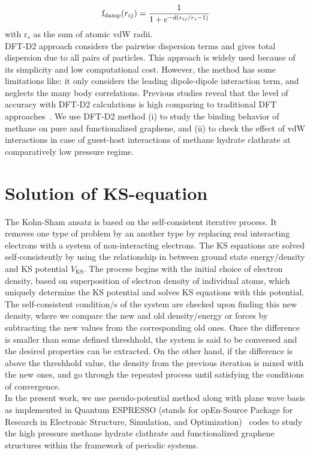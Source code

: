 \begin{eqnarray}
{\rm f}_{\rm damp}(r_{ij})=\frac{1}{1+e^{-d(r_{ij}/r_{s}-1)}}
\end{eqnarray}
with r$_{s}$ as the sum of atomic vdW radii.\\
DFT-D2 approach considers the pairwise dispersion terms and gives total dispersion due to all pairs of particles. This approach is widely used because of its simplicity and low computational cost. However, the method has some limitations like: it only considers the leading dipole-dipole interaction term, and neglects the many body correlations. Previous studies reveal that the level of accuracy with DFT-D2 calculations is high comparing to traditional DFT approaches~\citep{Joshi2013}. We use DFT-D2 method (i) to study the binding behavior of methane on pure and functionalized graphene, and (ii) to check the effect of vdW interactions in
case of guest-host interactions of methane hydrate clathrate at comparatively low pressure regime. 
\section{Solution of KS-equation}
The Kohn-Sham ansatz is based on the self-consistent iterative process. It removes one type of problem by an another type by replacing real interacting electrons with a system of non-interacting electrons. The KS equations are solved self-consistently by using the relationship in between ground state energy/density and KS potential $V_{\text{KS}}$.  The process begins with the initial choice of electron density, based on superposition of electron density of individual atoms, which uniquely determine the KS potential and solves KS equations with this potential. The self-consistent condition/s of the system are checked upon finding this new density, where we compare the new and old density/energy or forces by subtracting the new values from the corresponding old ones. Once the difference is smaller than some defined threshhold, the system is said to be conversed and the desired properties can be extracted. On the other hand, if the difference is above the threshhold value, the density from the previous iteration is mixed with the new ones, and go through the repeated process until satisfying the conditions of convergence.\\
In the present work, we use pseudo-potential method along with plane wave basis as implemented in Quantum ESPRESSO (stands for opEn-Source Package for Research in Electronic Structure, Simulation, and Optimization)~\citep{Giannozzi2009} codes to study the high pressure methane hydrate clathrate and functionalized graphene structures within the framework of periodic systems. 
